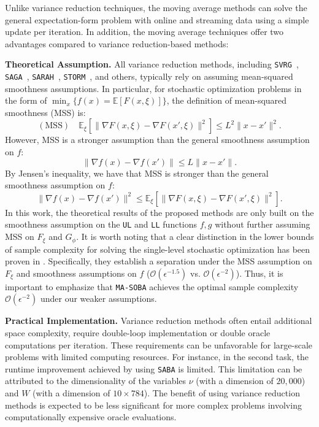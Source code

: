 \documentclass[10pt]{article}
\theoremstyle{remark}
\newcommand{\cO}{\mathcal{O}}
\begin{document}
Unlike variance reduction techniques, the moving average methods can solve the general expectation-form problem with online and streaming data using a simple update per iteration. In addition, the moving average techniques offer two advantages compared to variance reduction-based methods:


\textbf{Theoretical Assumption.} All variance reduction methods, including \texttt{SVRG}~\cite{reddi2016stochastic}, \texttt{SAGA}~\cite{defazio2014saga}, \texttt{SARAH}~\cite{nguyen2017sarah}, \texttt{STORM}~\cite{cutkosky2019momentum}, and others, typically rely on assuming mean-squared smoothness assumptions. In particular, for stochastic optimization problems in the form of $\min_x \{f(x) = \mathbb{E}[F(x,\xi)]\}$, the definition of mean-squared smoothness (MSS) is:
$$(\text{MSS}) \quad \mathbb{E}_{\xi}[\|\nabla F(x, \xi) - \nabla F(x', \xi)\|^2] \leq L^2 \| x-x' \|^2.$$
However, MSS is a stronger assumption than the general smoothness assumption on $f$:
$$\|\nabla f(x) - \nabla f(x')\| \leq L\| x- x' \|.$$
By Jensen’s inequality, we have that MSS is stronger than the general smoothness assumption on $f$:
$$\|\nabla f(x) - \nabla f(x')\|^2 \leq \mathbb{E}_{\xi}[\|\nabla F(x, \xi) - \nabla F(x', \xi)\|^2].$$
In this work, the theoretical results of the proposed methods are only built on the smoothness assumption on the \texttt{UL} and \texttt{LL} functions $f, g$ without further assuming MSS on $F_\xi$ and $G_\phi$. It is worth noting that a clear distinction in the lower bounds of sample complexity for solving the single-level stochastic optimization has been proven in \cite{arjevani2023lower}. Specifically, they establish a separation under the MSS assumption on $F_\xi$ and smoothness assumptions on $f$ ($\cO(\epsilon^{-1.5})$ vs. $\cO(\epsilon^{-2})$). %
Thus, it is important to emphasize that \texttt{MA-SOBA} achieves the optimal sample complexity $\cO(\epsilon^{-2})$ under our weaker assumptions.

\textbf{Practical Implementation.} Variance reduction methods often entail additional space complexity, require double-loop implementation or double oracle computations per iteration. These requirements can be unfavorable for large-scale problems with limited computing resources. For instance, in the second task, the runtime improvement achieved by using \texttt{SABA} is limited. This limitation can be attributed to the dimensionality of the variables $\nu$ (with a dimension of $20,000$) and $W$ (with a dimension of $10 \times 784$). The benefit of using variance reduction methods is expected to be less significant for more complex problems involving computationally expensive oracle evaluations.
\end{document}

